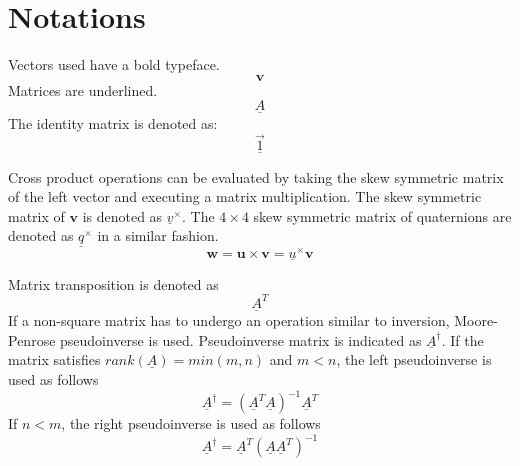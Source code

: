 \section*{Notations}

Vectors used have a bold typeface.  
\begin{equation*}
\textbf{v}
\end{equation*}
Matrices are underlined.
\begin{equation*}
\underline{A}
\end{equation*}
The identity matrix is denoted as:
\begin{equation*}
\underline{\vec 1}
\end{equation*}


Cross product operations can be evaluated by taking the skew symmetric matrix of the left vector and executing a matrix multiplication. The skew symmetric matrix of $\textbf{v}$ is denoted as $\underline{v}^\times$. The $4\times4$ skew symmetric matrix of quaternions are denoted as $\underline{q}^\times$ in a similar fashion.
\begin{equation*}
	\textbf{w} = \textbf{u} \times \textbf{v} = \underline{u}^\times \textbf{v}
\end{equation*}

Matrix transposition is denoted as
\begin{equation*}
\underline{A}^T
\end{equation*}
If a non-square matrix has to undergo an operation similar to inversion, Moore-Penrose pseudoinverse is used. Pseudoinverse matrix is indicated as $\underline{A}^\dagger$. If the matrix satisfies $rank(\underline{A}) = min(m,n)$ and $m < n$, the left pseudoinverse is used as follows
\begin{equation*}
\underline{A}^\dagger    =   (\underline{A}^T \underline{A} )^{-1} \underline{A}^T 
\end{equation*}
If $n < m$, the right pseudoinverse is used as follows
\begin{equation*}
 \underline{A}^\dagger    =  \underline{A}^T  (\underline{A} \underline{A}^T)^{-1}
\end{equation*}

